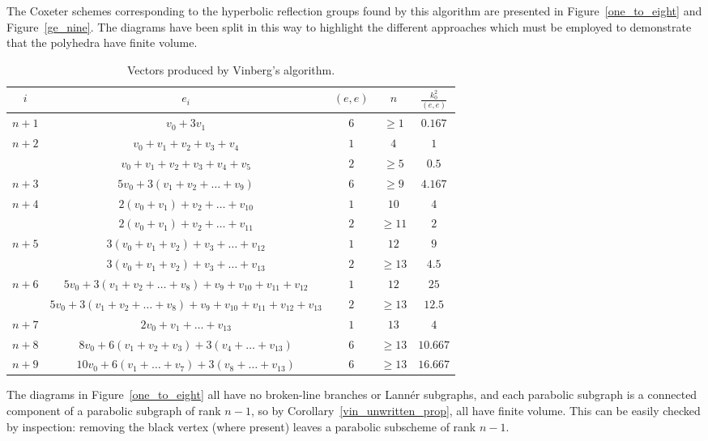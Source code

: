 \documentclass[smallcondensed]{svjour3}                     %
\begin{document}
The Coxeter schemes corresponding to the hyperbolic reflection groups found by this algorithm are presented in Figure~\ref{one_to_eight} and Figure~\ref{ge_nine}. The diagrams have been split in this way to highlight the different approaches which must be employed to demonstrate that the polyhedra have finite volume.
\begin{table}[h!]
\centering
\caption{Vectors produced by Vinberg's algorithm.}
  \begin{tabular}{c|c|c|c|c} \label{results_table}
    $i$ & $e_i$ & $(e,e)$ & $n$ & $\frac{k_0^2}{(e,e)}$\\
    \hline
    $n+1$ & $v_0 + 3 v_1$ & $6$ & $\ge 1$ & $0.167$\\
    $n+2$ & $v_0 + v_1 + v_2 + v_3 + v_4$ & $1$ & $4$ & $1$\\
    & $v_0 + v_1 + v_2 + v_3 + v_4 + v_5$ & $2$ & $\ge 5$ & $0.5$\\
    $n+3$ & $5 v_0 + 3(v_1 + v_2 + \ldots + v_9)$ & $6$ & $\ge 9$ & $4.167$\\
    $n+4$ & $2( v_0 + v_1) + v_2 + \ldots + v_{10}$ & $1$ & $10$ & $4$\\
    & $2( v_0 + v_1) + v_2 + \ldots + v_{11}$ & $2$ & $\ge 11$ & $2$\\
    $n+5$ & $3( v_0 + v_1 + v_2) + v_3 + \ldots + v_{12}$ & $1$ & $12$ & $9$\\
    & $3( v_0 + v_1 + v_2) + v_3 + \ldots + v_{13}$ & $2$ & $\ge 13$ & $4.5$\\
    $n+6$ & $5 v_0 + 3(v_1 + v_2 + \ldots + v_8) + v_9 + v_{10} + v_{11} + v_{12}$ & $1$ & $12$ & $25$\\
    & $5 v_0 + 3(v_1 + v_2 + \ldots + v_8) + v_9 + v_{10} + v_{11} + v_{12} + v_{13}$ & $2$ & $\ge 13$ & $12.5$\\
    $n+7$ & $2 v_0 + v_1 + \ldots + v_{13}$ & $1$ & $13$ & $4$\\
    $n+8$ & $8 v_0 + 6(v_1 + v_2 + v_3) + 3(v_4 + \ldots + v_{13})$ & $6$ & $\ge 13$ & $10.667$\\
    $n+9$ & $10 v_0 + 6(v_1 + \ldots + v_7) + 3(v_8 + \ldots + v_{13})$ & $6$ & $\ge 13$ & $16.667$\\
  \end{tabular}
\end{table}

The diagrams in Figure~\ref{one_to_eight} all have no broken-line branches or Lann\'{e}r subgraphs, and each parabolic subgraph is a connected component of a parabolic subgraph of rank $n-1$, so by Corollary~\ref{vin_unwritten_prop}, all have finite volume. This can be easily checked by inspection: removing the black vertex (where present) leaves a parabolic subscheme of rank $n-1$.
\end{document}
